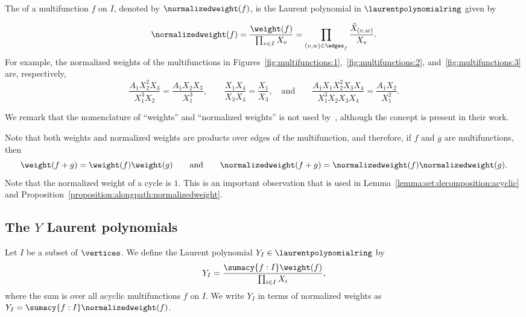The  of a multifunction \(f\) on \(I\), denoted by \(\normalizedweight(f)\), is the Laurent polynomial in \(\laurentpolynomialring\) given by

\begin{equation*}
    \normalizedweight(f)
    = \frac{\weight(f)}{\prod_{v \in I} X_v}
    = \prod_{(v, w) \in \edges_f} \frac{\Tilde{X}_{(v, w)}}{X_v}.
\end{equation*}
For example,
the normalized weights of the multifunctions in Figures~\ref{fig:multifunctions:1},~\ref{fig:multifunctions:2}, and~\ref{fig:multifunctions:3} are, respectively,
\begin{equation*}
    \frac{A_1 X_2^2 X_3}{X_1^3 X_2} = 
    \frac{A_1 X_2 X_3}{X_1^3},
    \qquad
    \frac{X_1 X_4}{X_3 X_4}=
    \frac{X_1}{X_3},
    \quad
    \text{and}
    \qquad
    \frac{A_1 X_1 X_2^2 X_3 X_4}{X_1^3 X_2 X_3 X_4} =
    \frac{A_1 X_2}{X_1^2}.
\end{equation*}

We remark that the nomenclature of ``weights'' and ``normalized weights'' is not used by~\cite{linearLP}, although the concept is present in their work.

Note that both weights and normalized weights are products over edges of the multifunction, and therefore, if \(f\) and \(g\) are multifunctions, then 
\begin{equation*}
    \weight(f + g) = \weight(f) \weight(g)
    \qquad \text{and} \qquad
    \normalizedweight(f + g) = \normalizedweight(f) \normalizedweight(g).
\end{equation*}
Note that the normalized weight of a cycle is \(1\).
This is an important observation that is used in Lemma~\ref{lemma:set:decomposition:acyclic} and Proposition~\ref{proposition:alongpath:normalizedweight}.

\subsection{The \texorpdfstring{\(Y\)}{Y} Laurent polynomials} \label{subsection:Ylaurentpolynomials}

Let \(I\) be a subset of \(\vertices\).
We define the Laurent polynomial \(Y_I \in \laurentpolynomialring\) by
\begin{equation*}
    Y_I = \frac{\sumacy{f : I} \weight(f)}{\prod_{i \in I} X_i},
\end{equation*}
where the sum is over all acyclic multifunctions \(f\) on \(I\).
We write \(Y_I\) in terms of normalized weights as \(Y_I = \sumacy{f:I} \normalizedweight(f)\).

